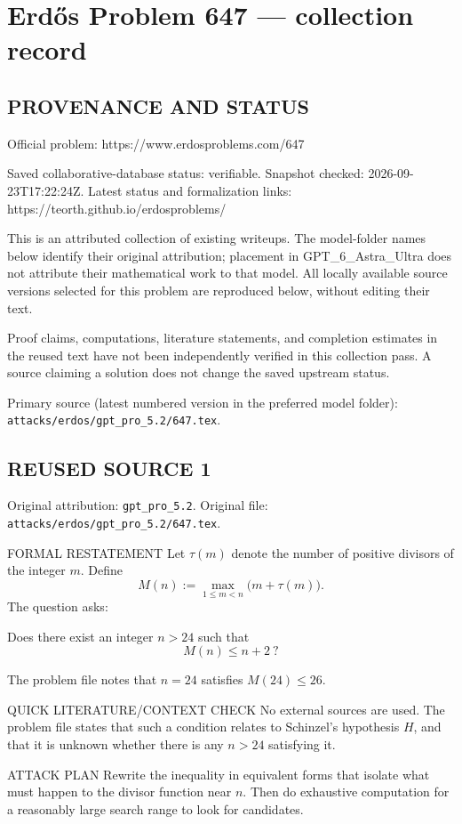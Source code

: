 \section*{Erd\H{o}s Problem 647 --- collection record}

\subsection*{PROVENANCE AND STATUS}
Official problem: https://www.erdosproblems.com/647

Saved collaborative-database status: verifiable.
Snapshot checked: 2026-09-23T17:22:24Z.
Latest status and formalization links: https://teorth.github.io/erdosproblems/

This is an attributed collection of existing writeups. The model-folder names below identify their original attribution; placement in GPT\_6\_Astra\_Ultra does not attribute their mathematical work to that model. All locally available source versions selected for this problem are reproduced below, without editing their text.

Proof claims, computations, literature statements, and completion estimates in the reused text have not been independently verified in this collection pass. A source claiming a solution does not change the saved upstream status.

Primary source (latest numbered version in the preferred model folder): \texttt{attacks/erdos/gpt\_pro\_5.2/647.tex}.

\subsection*{REUSED SOURCE 1}
Original attribution: \texttt{gpt\_pro\_5.2}.
Original file: \texttt{attacks/erdos/gpt\_pro\_5.2/647.tex}.


FORMAL RESTATEMENT
Let $\tau(m)$ denote the number of positive divisors of the integer $m$.
Define
\[
M(n):=\max_{1\le m<n}\bigl(m+\tau(m)\bigr).
\]
The question asks:

\medskip
\noindent Does there exist an integer $n>24$ such that
\[
M(n)\le n+2\ ?
\]

The problem file notes that $n=24$ satisfies $M(24)\le 26$.

QUICK LITERATURE/CONTEXT CHECK
No external sources are used.
The problem file states that such a condition relates to Schinzel's hypothesis $H$,
and that it is unknown whether there is any $n>24$ satisfying it.

ATTACK PLAN
Rewrite the inequality in equivalent forms that isolate what must happen to the
divisor function near $n$.
Then do exhaustive computation for a reasonably large search range to look for
candidates.

